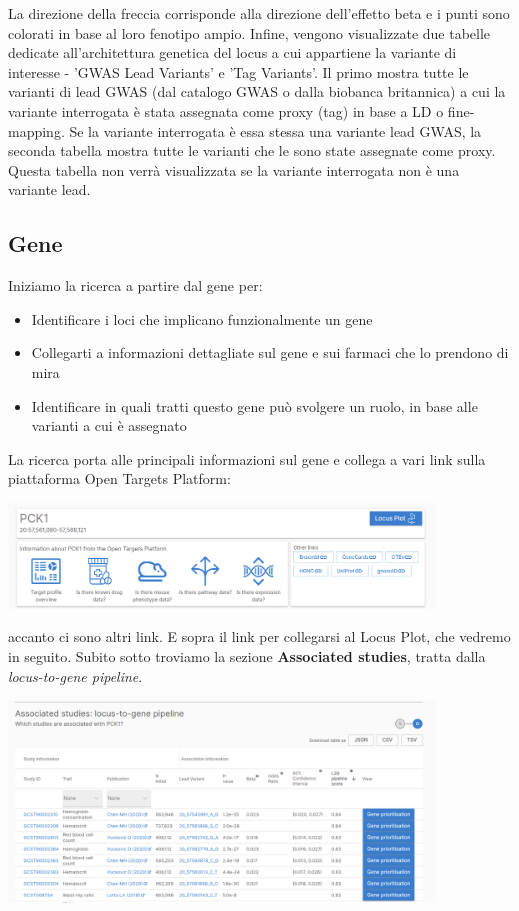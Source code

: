 \documentclass{article}
\begin{document}
La direzione della freccia corrisponde alla direzione dell'effetto beta e i punti sono colorati in base al loro fenotipo ampio.
Infine, vengono visualizzate due tabelle dedicate all'architettura genetica del locus a cui appartiene la variante di interesse - 'GWAS Lead Variants' e 'Tag Variants'. Il primo mostra tutte le varianti di lead GWAS (dal catalogo GWAS o dalla biobanca britannica) a cui la variante interrogata è stata assegnata come proxy (tag) in base a LD o fine-mapping. Se la variante interrogata è essa stessa una variante lead GWAS, la seconda tabella mostra tutte le varianti che le sono state assegnate come proxy. Questa tabella non verrà visualizzata se la variante interrogata non è una variante lead.
\subsection{Gene}
\begin{box4}
    [title={\textbf{Ricerca per Gene}}]
    {Iniziamo la ricerca a partire dal gene per:
    \begin{itemize}
        \item Identificare i loci che implicano funzionalmente un gene
        \item Collegarti a informazioni dettagliate sul gene e sui farmaci che lo prendono di mira
        \item Identificare in quali tratti questo gene può svolgere un ruolo, in base alle varianti a cui è assegnato
    \end{itemize}}
\end{box4}
La ricerca porta alle principali informazioni sul gene e collega a vari link sulla piattaforma Open Targets Platform:
\begin{center}
    \includegraphics[width=0.85\textwidth]{figures/1-Gene.png}
\end{center}
accanto ci sono altri link. E sopra il link per collegarsi al Locus Plot, che vedremo in seguito.
Subito sotto troviamo la sezione \textbf{Associated studies}, tratta dalla \textit{locus-to-gene pipeline}.
\begin{center}
    \includegraphics[width=0.85\textwidth]{figures/2-Gene.png}
\end{center}
\end{document}
